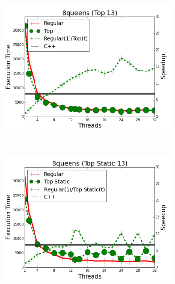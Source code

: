 \begin{figure}[]
        \centering
        \begin{subfigure}[b]{\plotsize\textwidth}
           \includegraphics[width=\textwidth]{experiments/coordination/cmp-top-8queens-13.png}
           \caption{}
           \label{fig:coordination:coord_13queenstop}
        \end{subfigure}
        ~
        \begin{subfigure}[b]{\plotsize\textwidth}
           \includegraphics[width=\textwidth]{experiments/coordination/cmp-top-static-8queens-13.png}
           \caption{}
           \label{fig:coordination:coord_13queenstopstatic}
        \end{subfigure} \\

\end{figure}
